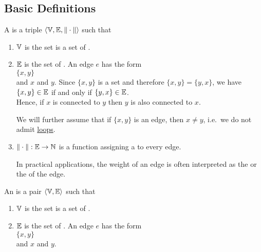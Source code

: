 \subsection{Basic Definitions}
\begin{Definition} A  is a triple 
   $\langle {\mathbb V}, {\mathbb E}, \|\cdot\| \rangle$ such that
  \begin{enumerate}
  \item ${\mathbb V}$ is the set is a set of  .
  \item ${\mathbb E}$ is the set of  .  An edge $e$ has the form
        \\[0.2cm]
        \hspace*{1.3cm}
        $\{x, y\}$
        \\[0.2cm]
        and  $x$ and $y$.  Since $\{x,y\}$ is a set and therefore $\{x,y\} = \{y,x\}$, we have
        \\[0.2cm]
        \hspace*{1.3cm}
        $\{x,y\} \in {\mathbb E}$ \quad if and only if \quad $\{y,x\} \in {\mathbb E}$.
        \\[0.2cm]
        Hence, if $x$ is connected to $y$ then $y$ is also connected to $x$.

        We will further assume that if $\{x,y\}$ is an edge, then $x \not= y$, i.e.~we do not admit
        \href{https://en.wikipedia.org/wiki/Loop_(graph_theory)}{loops}. 
  \item $\|\cdot\|: {\mathbb E} \rightarrow {\mathbb N}$ is a function assigning a  to every edge.

        In practical applications, the weight of an edge is often interpreted as the  or the
         of the edge.
        \eoxs
  \end{enumerate}
\end{Definition}

\begin{Definition}
  An  is a pair
   $\langle {\mathbb V}, {\mathbb E}\rangle$ such that
  \begin{enumerate}
  \item ${\mathbb V}$ is the set is a set of  .
  \item ${\mathbb E}$ is the set of  . An edge $e$ has the form
        \\[0.2cm]
        \hspace*{1.3cm}
        $\{x, y\}$
        \\[0.2cm]
        and  $x$ and $y$.
        \eoxs
  \end{enumerate}
\end{Definition}

